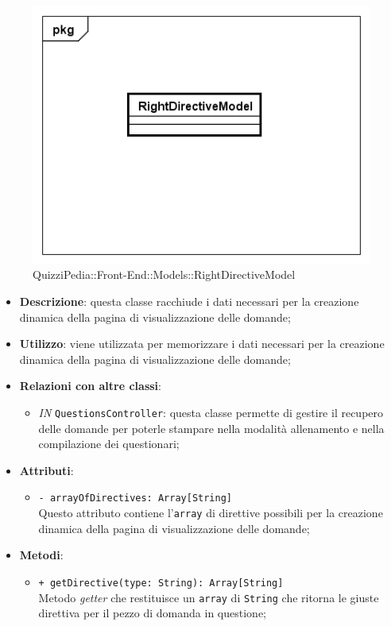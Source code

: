 		\begin{figure}[ht]
			\centering
			\includegraphics[scale=0.5,keepaspectratio]{UML/Classi/Front-End/QuizziPedia_Front-end_Models_RightDirectiveModel.png}
			\caption{QuizziPedia::Front-End::Models::RightDirectiveModel}
		\end{figure} \FloatBarrier
		
		\begin{itemize}
			\item \textbf{Descrizione}: questa classe racchiude i dati necessari per la creazione dinamica della pagina di visualizzazione delle domande;
			\item \textbf{Utilizzo}: viene utilizzata per memorizzare i dati necessari per la creazione dinamica della pagina di visualizzazione delle domande;
			\item \textbf{Relazioni con altre classi}: 
			\begin{itemize}
				\item \textit{IN} \texttt{QuestionsController}: questa classe permette di gestire il recupero delle domande per poterle stampare nella modalità allenamento e nella compilazione dei questionari;
			\end{itemize}
			\item \textbf{Attributi}: 
			\begin{itemize}
				\item \texttt{- arrayOfDirectives: Array[String]}\\
				Questo attributo contiene l'\texttt{array} di direttive possibili per la creazione dinamica della pagina di visualizzazione delle domande;
			\end{itemize}
			\item \textbf{Metodi}: 
			\begin{itemize}
				\item \texttt{+ getDirective(type: String): Array[String]} \\
				Metodo \textit{getter} che restituisce un \texttt{array} di \texttt{String} che ritorna le giuste direttiva per il pezzo di domanda in questione;
			\end{itemize}
		\end{itemize}														